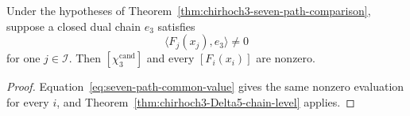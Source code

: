 \begin{corollary}
\label{cor:chirhoch3-seven-fold-confirmation}
\ClaimStatusProvedHere
Under the hypotheses of
Theorem~\ref{thm:chirhoch3-seven-path-comparison}, suppose a closed dual
chain \(e_3\) satisfies
\[
 \langle F_j(x_j),e_3\rangle\ne0
\]
for one \(j\in\mathcal I\).  Then
\([\chi_3^{\mathrm{cand}}]\) and every \([F_i(x_i)]\) are nonzero.
\end{corollary}

\begin{proof}
Equation~\eqref{eq:seven-path-common-value} gives the same nonzero
evaluation for every \(i\), and
Theorem~\ref{thm:chirhoch3-Delta5-chain-level} applies.
\end{proof}
